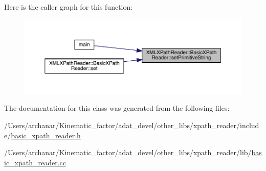 Here is the caller graph for this function\+:
\nopagebreak
\begin{figure}[H]
\begin{center}
\leavevmode
\includegraphics[width=350pt]{d6/dbf/classXMLXPathReader_1_1BasicXPathReader_a1cc6aa3e855c995ebd874c475a68a076_icgraph}
\end{center}
\end{figure}


The documentation for this class was generated from the following files\+:\begin{DoxyCompactItemize}
\item 
/\+Users/archanar/\+Kinematic\+\_\+factor/adat\+\_\+devel/other\+\_\+libs/xpath\+\_\+reader/include/\mbox{\hyperlink{other__libs_2xpath__reader_2include_2basic__xpath__reader_8h}{basic\+\_\+xpath\+\_\+reader.\+h}}\item 
/\+Users/archanar/\+Kinematic\+\_\+factor/adat\+\_\+devel/other\+\_\+libs/xpath\+\_\+reader/lib/\mbox{\hyperlink{basic__xpath__reader_8cc}{basic\+\_\+xpath\+\_\+reader.\+cc}}\end{DoxyCompactItemize}
